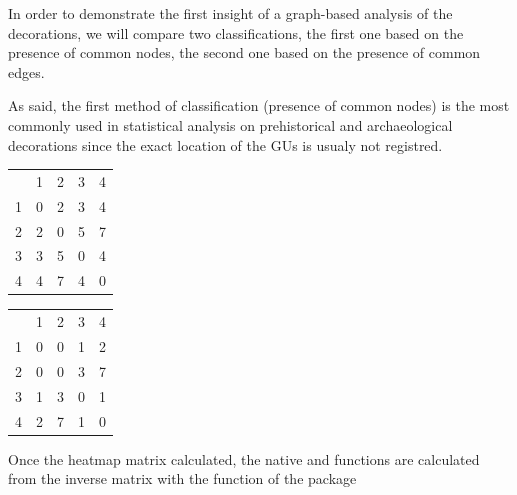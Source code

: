 \documentclass[article]{jss}\usepackage{knitr}
\begin{document}
In order to demonstrate the first insight of a graph-based analysis of the decorations, we will compare two classifications, the first one based on the presence of common nodes, the second one based on the presence of common edges. 

As said, the first method of classification (presence of common nodes) is the most commonly used in statistical analysis on prehistorical and archaeological decorations since the exact location of the GUs is usualy not registred.

\begin{table}[H]
\begin{minipage}{.45\textwidth}
\centering
\begin{tabular}{rrrrr}
  & 1 & 2 & 3 & 4 \\ 
 1 & 0 & 2 & 3 & 4 \\ 
  2 & 2 & 0 & 5 & 7 \\ 
  3 & 3 & 5 & 0 & 4 \\ 
  4 & 4 & 7 & 4 & 0 \\ 
  \end{tabular}

\end{minipage}
\begin{minipage}{.45\textwidth}
\centering
\begin{tabular}{rrrrr}
  & 1 & 2 & 3 & 4 \\ 
 1 & 0 & 0 & 1 & 2 \\ 
  2 & 0 & 0 & 3 & 7 \\ 
  3 & 1 & 3 & 0 & 1 \\ 
  4 & 2 & 7 & 1 & 0 \\ 
  \end{tabular}

\end{minipage}
\end{table}

Once the heatmap matrix calculated, the native  and  functions \citep{R19} are calculated from the inverse matrix with the function  of the  package \citep{Friendly20} 
\end{document}
